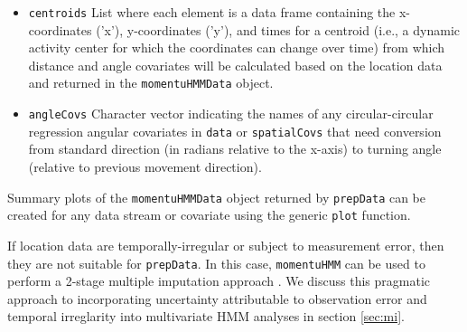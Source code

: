 \documentclass[12pt]{article}\usepackage[]{graphicx}\usepackage[]{xcolor}
\begin{document}
\begin{itemize}
  \item{\verb|centroids|} List where each element is a data frame containing the x-coordinates ('x'), y-coordinates ('y'), and times for a centroid (i.e., a dynamic activity center for which the coordinates can change over time) from which distance and angle covariates will be calculated based on the location data and returned in the \verb|momentuHMMData| object.
  \item{\verb|angleCovs|} Character vector indicating the names of any circular-circular regression angular covariates in \verb|data| or \verb|spatialCovs| that need conversion from standard direction (in radians relative to the x-axis) to turning angle (relative to previous movement direction).
\end{itemize}
Summary plots of the \verb|momentuHMMData| object returned by \verb|prepData| can be created for any data stream or covariate using the generic \verb|plot| function.

If location data are temporally-irregular or subject to measurement error, then they are not suitable for \verb|prepData|. In this case, \verb|momentuHMM| can be used to perform a 2-stage multiple imputation approach \citep{McClintock2017}. We discuss this pragmatic approach to incorporating uncertainty attributable to observation error and temporal irreglarity into multivariate HMM analyses in section \ref{sec:mi}.
\end{document}
